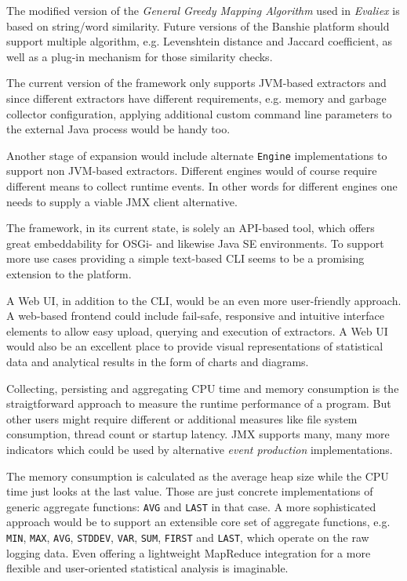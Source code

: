 The modified version of the \textit{General Greedy Mapping Algorithm} used in \textit{Evaliex} is based on string/word similarity. Future versions of the Banshie platform should support multiple algorithm, e.g. Levenshtein distance and Jaccard coefficient, as well as a plug-in mechanism for those similarity checks.

The current version of the framework only supports \gls{JVM}-based extractors and since different extractors have different requirements, e.g. memory and garbage collector configuration, applying additional custom command line parameters to the external Java process would be handy too.

Another stage of expansion would include alternate \texttt{Engine} implementations to support non \gls{JVM}-based extractors. Different engines would of course require different means to collect runtime events. In other words for different engines one needs to supply a viable \gls{JMX} client alternative.

The framework, in its current state, is solely an \gls{API}-based tool, which offers great embeddability for \gls{OSGi}- and likewise Java SE environments. To support more use cases providing a simple text-based \gls{CLI} seems to be a promising extension to the platform.

A Web \gls{UI}, in addition to the \gls{CLI}, would be an even more user-friendly approach. A web-based frontend could include fail-safe, responsive and intuitive interface elements to allow easy upload, querying and execution of extractors. A Web \gls{UI} would also be an excellent place to provide visual representations of statistical data and analytical results in the form of charts and diagrams.

Collecting, persisting and aggregating CPU time and memory consumption is the straigtforward approach to measure the runtime performance of a program. But other users might require different or additional measures like file system consumption, thread count or startup latency. \gls{JMX} supports many, many more indicators which could be used by alternative \textit{event production} implementations.

The memory consumption is calculated as the average heap size while the CPU time just looks at the last value. Those are just concrete implementations of generic aggregate functions: \texttt{AVG} and \texttt{LAST} in that case. A more sophisticated approach would be to support an extensible core set of aggregate functions, e.g. \texttt{MIN}, \texttt{MAX}, \texttt{AVG}, \texttt{STDDEV}, \texttt{VAR}, \texttt{SUM}, \texttt{FIRST} and \texttt{LAST}, which operate on the raw logging data. Even offering a lightweight MapReduce integration for a more flexible and user-oriented statistical analysis is imaginable.